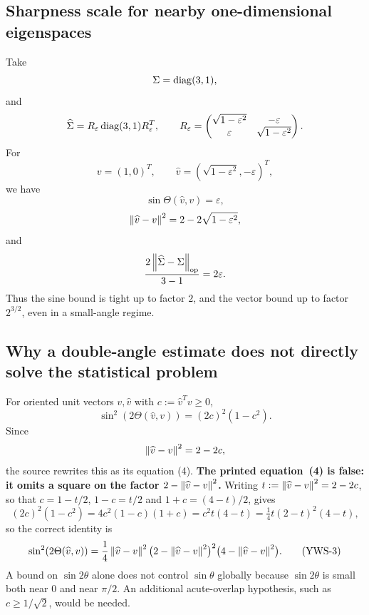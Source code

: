 \subsection{Sharpness scale for nearby one-dimensional eigenspaces}

Take
\[
  \Sigma=\operatorname{diag}(3,1),
\]
and
\[
  \widehat\Sigma
  =R_\varepsilon\operatorname{diag}(3,1)R_\varepsilon^T,
  \qquad
  R_\varepsilon=
  \begin{pmatrix}
    \sqrt{1-\varepsilon^2}&-\varepsilon\\
    \varepsilon&\sqrt{1-\varepsilon^2}
  \end{pmatrix}.
\]
For
\[
  v=(1,0)^T,
  \qquad
  \widehat v=(\sqrt{1-\varepsilon^2},-\varepsilon)^T,
\]
we have
\[
  \sin\Theta(\widehat v,v)=\varepsilon,
\]
\[
  \left\lVert \widehat v-v\right\rVert^2
  =2-2\sqrt{1-\varepsilon^2},
\]
and
\[
  \frac{2\left\lVert \widehat\Sigma-\Sigma\right\rVert_{\mathrm{op}}}{3-1}
  =2\varepsilon.
\]
Thus the sine bound is tight up to factor $2$, and the vector bound up to factor $2^{3/2}$, even in a small-angle regime.

\subsection{Why a double-angle estimate does not directly solve the statistical problem}

For oriented unit vectors $v,\widehat v$ with $c:=\widehat v^Tv\ge0$,
\[
  \sin^2(2\Theta(\widehat v,v))
  =(2c)^2(1-c^2).
\]
Since
\[
  \left\lVert \widehat v-v\right\rVert^2=2-2c,
\]
the source rewrites this as its equation (4). \textbf{The printed equation~(4) is
false: it omits a square on the factor $2-\left\lVert \widehat v-v\right\rVert^2$.} Writing
$t:=\left\lVert \widehat v-v\right\rVert^2=2-2c$, so that $c=1-t/2$, $1-c=t/2$ and
$1+c=(4-t)/2$, gives
\[
  (2c)^2(1-c^2)=4c^2(1-c)(1+c)=c^2t(4-t)=\tfrac14 t(2-t)^2(4-t),
\]
so the correct identity is
\begin{equation}
  \sin^2(2\Theta(\widehat v,v))
  =\frac14\left\lVert \widehat v-v\right\rVert^2
    \bigl(2-\left\lVert \widehat v-v\right\rVert^2\bigr)^2
    \bigl(4-\left\lVert \widehat v-v\right\rVert^2\bigr). \tag{YWS-3}
\end{equation}
A bound on $\sin2\theta$ alone does not control $\sin\theta$ globally because $\sin2\theta$ is small both near $0$ and near $\pi/2$. An additional acute-overlap hypothesis, such as $c\ge1/\sqrt2$, would be needed.

